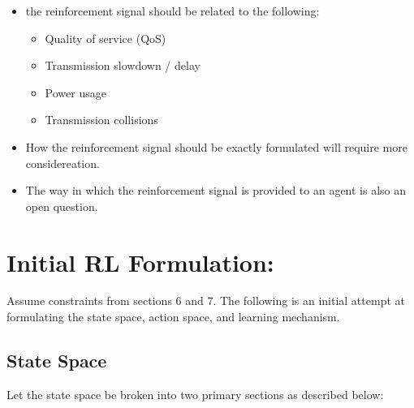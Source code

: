\documentclass[11pt]{article}
\providecommand{\tightlist}{%
      \setlength{\itemsep}{0pt}\setlength{\parskip}{0pt}}
\begin{document}
\begin{itemize}
\item
  the reinforcement signal should be related to the following:

  \begin{itemize}
  \tightlist
  \item
    Quality of service (QoS)
  \item
    Transmission slowdown / delay
  \item
    Power usage
  \item
    Transmission collisions
  \end{itemize}
\item
  How the reinforcement signal should be exactly formulated will require
  more considereation.
\item
  The way in which the reinforcement signal is provided to an agent is
  also an open question.
\end{itemize}

    \hypertarget{initial-rl-form}{%
\pagebreak
\section{Initial RL Formulation:}\label{initial-rl-form}}
Assume constraints from sections 6 and 7. The following is an initial attempt
at formulating the state space, action space, and learning mechanism. 

\subsection{State Space}
Let the state space be broken into two primary sections as described below:
\end{document}

